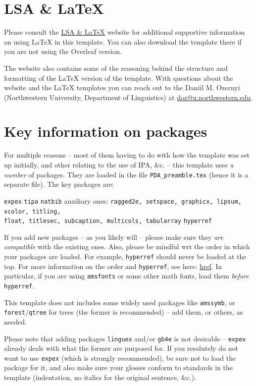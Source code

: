 \documentclass{article}
\begin{document}
\section{LSA \& \LaTeX{}}
Please consult the \href{https://dozernyi.gitlab.io/lsalatex/}{LSA \& \LaTeX{}} website for additional supportive information on using \LaTeX{} in this template. You can also download the template there if you are not using the Overleaf version. 

The website also contains some of the reasoning behind the structure and formatting of the \LaTeX{} version of the template. With questions about the website and the \LaTeX{} templates you can reach out to the Daniil M. Ozernyi (Northwestern University, Department of Linguistics) at \href{mailto:doz@u.northwestrn.edu}{doz@u.northwestern.edu}.


\section{Key information on packages}
For multiple reasons -- most of them having to do with how the template was set up initially, and other relating to the use of IPA, \&c. -- this template uses \textit{a number} of packages. They are loaded in the file \verb=PDA_preamble.tex= (hence it is a separate file). The key packages are:

\pex
\a \verb=expex=
\a \verb=tipa=
\a \verb=natbib= 
\a auxiliary ones: \verb=ragged2e, setspace, graphicx, lipsum, xcolor, titling,= \\ \verb=float, titlesec, subcaption, multicols, tabularray=
\a \verb=hyperref=
\xe

If you add new packages -- as you likely will -- please make sure they \textit{are compatible} with the existing ones. Also, please be mindful wrt the order in which your packages are loaded. For example, \verb=hyperref= should never be loaded at the top. For more information on the order and \verb=hyperref=, see here: \href{https://texblog.net/hyperref/}{href}. In particular, if you are using \verb=amsfonts= or some other math fonts, load them \textit{before} \verb=hyperref=.

This template does not includes some widely used packages like \verb=amssymb=, or \verb=forest=/\verb=qtree= for trees (the former is recommended) -- add them, or others, as needed.

Please note that adding packages \verb=linguex= and/or \verb=gb4e= is not desirable -- \verb=expex= already deals with what the former are purposed for. If you resolutely do not want to use \verb=expex= (which is strongly recommended), be sure not to load the package for it, and also make sure your glosses conform to standards in the template (indentation, no italics for the original sentence, \&c.).
\end{document}
